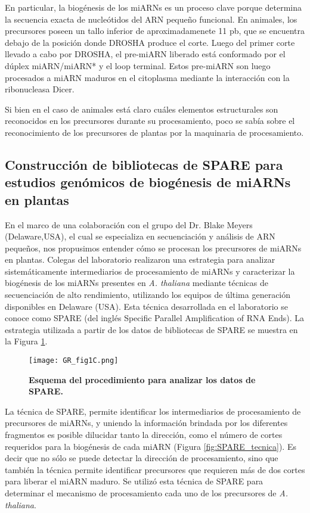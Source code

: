 En particular, la biogénesis de los miARNs es un proceso clave porque determina la secuencia exacta de nucleótidos del ARN pequeño funcional.
En animales, los precursores poseen un tallo inferior de aproximadamenete 11 pb, que se encuentra debajo de la posición donde DROSHA produce el corte.
Luego del primer corte llevado a cabo por DROSHA, el pre-miARN liberado está conformado por el dúplex miARN/miARN* y el loop terminal.
Estos pre-miARN son luego procesados a miARN maduros en el citoplasma mediante la interacción con la ribonucleasa Dicer.

Si bien en el caso de animales está claro cuáles elementos estructurales son reconocidos en los precursores durante su procesamiento, poco se sabía sobre el reconocimiento de los precursores de plantas por la maquinaria de procesamiento.

\subsection{Construcción de bibliotecas de SPARE para estudios genómicos de biogénesis de miARNs en plantas}

En el marco de una colaboración con el grupo del Dr. Blake Meyers (Delaware,USA), el cual se especializa en secuenciación y análisis de ARN pequeños, nos propusimos entender cómo se procesan los precursores de miARNs en plantas. 
Colegas del laboratorio realizaron una estrategia para analizar sistemáticamente intermediarios de procesamiento de miARNs y caracterizar la biogénesis de los miARNs presentes en \textit{A. thaliana} mediante técnicas de secuenciación de alto rendimiento, utilizando los equipos de última generación disponibles en Delaware (USA).
Esta técnica desarrollada en el laboratorio se conoce como SPARE \citep{Schapire2013} (del inglés Specific Parallel Amplification of RNA Ends).
La estrategia utilizada a partir de los datos de bibliotecas de SPARE se muestra en la Figura \ref{fig:GR_fig1C}.

\begin{figure}[htbp!] 
    \centering    
    \texttt{[image: GR\_fig1C.png]}
    \caption[Esquema del procedimiento para analizar los datos de SPARE]{
        \textbf{Esquema del procedimiento para analizar los datos de SPARE.}
    }
    \label{fig:GR_fig1C}
\end{figure}

La técnica de SPARE, permite identificar los intermediarios de procesamiento de precursores de miARNs, y uniendo la información brindada por los diferentes fragmentos es posible dilucidar tanto la dirección, como el número de cortes requeridos para la biogénesis de cada miARN (Figura \ref{fig:SPARE_tecnica}).
Es decir que no sólo se puede detectar la dirección de procesamiento, sino que también la técnica permite identificar precursores que requieren más de dos cortes para liberar el miARN maduro.
Se utilizó esta técnica de SPARE para determinar el mecanismo de procesamiento cada uno de los precursores de \textit{A. thaliana}.

